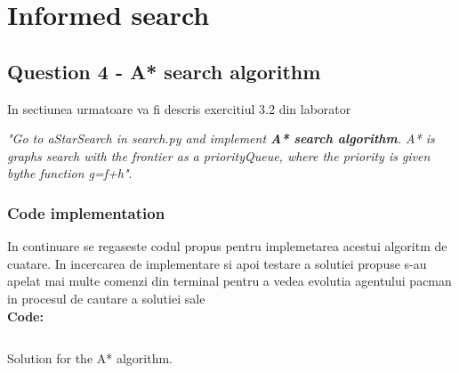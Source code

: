 \section{Informed search}
\graphicspath{{images/}}
\subsection{Question 4 - A* search  algorithm}
In sectiunea urmatoare va fi descris exercitiul 3.2 din laborator \newline


\textit{"Go to aStarSearch in search.py and implement \textbf{A* search algorithm}. A* is graphs search with the frontier as a priorityQueue, where the priority is given bythe function g=f+h"}.


\subsubsection{Code implementation}
In continuare se regaseste codul propus pentru implemetarea acestui algoritm de cuatare. In incercarea de implementare si apoi testare a solutiei propuse s-au apelat mai multe comenzi din terminal pentru a vedea evolutia agentului pacman in procesul de cautare a solutiei sale \\

\textbf{Code:}
\begin{listing}[h]
    \inputminted[linenos]{python}{code/04_a_star.py}
    \caption{Solution for the A* algorithm.}
    \label{listing:a_star}
\end{listing}


